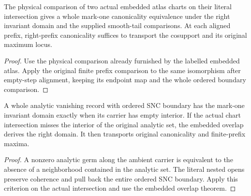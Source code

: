 \begin{theorem}
\label{hir:g8-labelled-embedded-original-overlap}
\leanok
The physical comparison of two actual embedded atlas charts
on their literal intersection gives a whole mark-one
canonicality equivalence under the right invariant domain
and the supplied smooth-tail comparisons. At each aligned
prefix, right-prefix canonicality suffices to transport the
cosupport and its original maximum locus.
\end{theorem}
\begin{proof}
Use the physical comparison already furnished by the labelled
embedded atlas. Apply the original finite prefix comparison
to the same isomorphism after empty-step alignment, keeping
its endpoint map and the whole ordered boundary comparison.
\end{proof}

\begin{theorem}
\label{hir:g8-proper-embedded-original-overlap}
\leanok
A whole analytic vanishing record with ordered SNC boundary
has the mark-one invariant domain exactly when its carrier
has empty interior. If the actual chart intersection misses
the interior of the original analytic set, the embedded
overlap derives the right domain. It then transports
original canonicality and finite-prefix maxima.
\end{theorem}
\begin{proof}
A nonzero analytic germ along the ambient carrier is
equivalent to the absence of a neighborhood contained in the
analytic set. The literal nested opens preserve coherence and
pull back the entire ordered SNC boundary. Apply this criterion
on the actual intersection and use the embedded overlap theorem.
\end{proof}

